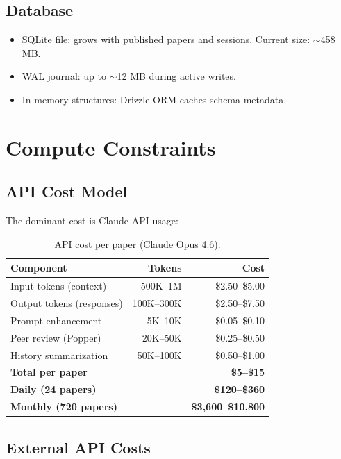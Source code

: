 \subsection{Database}

\begin{itemize}
  \item SQLite file: grows with published papers and sessions. Current size: $\sim$458 MB.
  \item WAL journal: up to $\sim$12 MB during active writes.
  \item In-memory structures: Drizzle ORM caches schema metadata.
\end{itemize}

\section{Compute Constraints}
\label{sec:perf:compute}

\subsection{API Cost Model}

The dominant cost is Claude API usage:

\begin{table}[H]
\centering
\caption{API cost per paper (Claude Opus 4.6).}
\label{tab:cost-model}
\begin{tabular}{lrr}
\toprule
\textbf{Component} & \textbf{Tokens} & \textbf{Cost} \\
\midrule
Input tokens (context) & 500K--1M & \$2.50--\$5.00 \\
Output tokens (responses) & 100K--300K & \$2.50--\$7.50 \\
Prompt enhancement & 5K--10K & \$0.05--\$0.10 \\
Peer review (Popper) & 20K--50K & \$0.25--\$0.50 \\
History summarization & 50K--100K & \$0.50--\$1.00 \\
\midrule
\textbf{Total per paper} & & \textbf{\$5--\$15} \\
\textbf{Daily (24 papers)} & & \textbf{\$120--\$360} \\
\textbf{Monthly (720 papers)} & & \textbf{\$3,600--\$10,800} \\
\bottomrule
\end{tabular}
\end{table}

\subsection{External API Costs}

